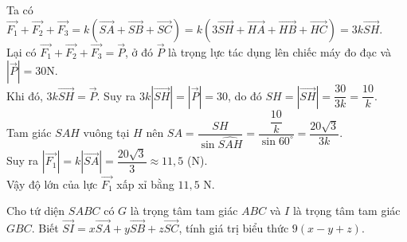 \begin{bt}
{		Ta có $\overrightarrow{F_1}+\overrightarrow{F_2}+\overrightarrow{F_3}=k\left(\overrightarrow{SA}+\overrightarrow{SB}+\overrightarrow{SC}\right)=k\left(3\overrightarrow{SH}+\overrightarrow{HA}+\overrightarrow{HB}+\overrightarrow{HC}\right)=3k\overrightarrow{SH}$.\\ 
		Lại có $\overrightarrow{F_1}+\overrightarrow{F_2}+\overrightarrow{F_3}=\overrightarrow{P}$, ở đó $\overrightarrow{P}$ là trọng lực tác dụng lên chiếc máy đo đạc và  $\left|\overrightarrow{P}\right|=30$N.\\
		Khi đó, $3k\overrightarrow{SH}=\overrightarrow{P}$. Suy ra $3k\left|\overrightarrow{SH}\right|=\left|\overrightarrow{P}\right|=30$, do đó $SH=\left|\overrightarrow{SH}\right|=\dfrac{30}{3k}=\dfrac{10}{k}$.\\ 
		Tam giác $SAH$ vuông tại $H$ nên $SA=\dfrac{SH}{\sin\widehat{SAH}}=\dfrac{\dfrac{10}{k}}{\sin  60^{\circ}}=\dfrac{20\sqrt{3}}{3k}$.\\
		Suy ra $\left|\overrightarrow{F_1}\right|=k\left|\overrightarrow{SA}\right|=\dfrac{20\sqrt{3}}{3}\approx 11{,}5$  (N).\\
	Vậy độ lớn của lực $\overrightarrow{F_1}$ xấp  xỉ bằng $11{,}5$ N.}
\end{bt}

\begin{bt}%
	Cho tứ diện $SABC$ có $G$ là trọng  tâm tam giác $ABC$ và $I$ là trọng tâm tam giác $GBC$. Biết $\overrightarrow{SI}=x\overrightarrow{SA}+y\overrightarrow{SB}+z\overrightarrow{SC}$, tính giá trị biểu thức $9\left(x-y+z\right)$.
\end{bt}

